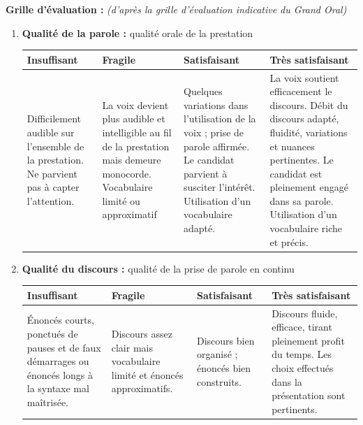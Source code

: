 \documentclass[a4paper,12pt,exos]{nsi}
\begin{document}
    \newpage
    \textbf{Grille d'évaluation :} \textit{(d'après la grille d'évaluation
        indicative du Grand Oral)
    }
    \begin{enumerate}[label=\textbullet]
        \item 	\textbf{Qualité de la parole :} qualité orale de la prestation\\[.5em]
        \begin{tabular}{|p{3.8cm}|p{3.8cm}|p{3.8cm}|p{3.8cm}|}
            \hline
            Insuffisant & Fragile & Satisfaisant & Très satisfaisant\\
            \hline
            Difficilement audible sur l'ensemble de la prestation.\newline
            Ne parvient pas à capter l'attention. &
            La voix devient plus audible et intelligible au fil de la prestation mais demeure monocorde.\newline
            Vocabulaire limité ou approximatif &
            Quelques variations dans l'utilisation de la voix ; prise de parole affirmée.\newline
            Le candidat parvient à susciter l'intérêt.\newline
            Utilisation d'un vocabulaire adapté.&
            La voix soutient efficacement le discours.\newline
            Débit du discours adapté, fluidité, variations et nuances pertinentes.\newline
            Le candidat est pleinement engagé dans sa parole.\newline
            Utilisation d'un vocabulaire riche et précis.
    \\
            \hline
        \end{tabular}
        \vspace{.5cm}
        
        \item 	\textbf{Qualité du discours :} qualité de la prise de parole en continu\\[.5em]
        \begin{tabular}{|p{3.8cm}|p{3.8cm}|p{3.8cm}|p{3.8cm}|}
            \hline
            Insuffisant & Fragile & Satisfaisant & Très satisfaisant\\
            \hline
            Énoncés courts, ponctués de pauses et de faux démarrages ou énoncés longs à la syntaxe mal maîtrisée. &
            Discours assez clair mais vocabulaire limité et énoncés approximatifs.  &
            Discours bien organisé ; énoncés bien construits.&
            Discours fluide, efficace, tirant pleinement profit du temps.\newline
            Les choix effectués dans la présentation sont pertinents.
    \\
            \hline
        \end{tabular}
        \vspace{.5cm}
        

\end{enumerate}
\end{document}
